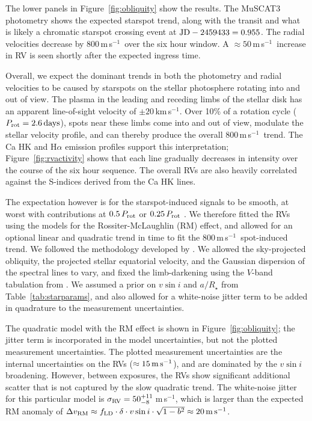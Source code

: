\documentclass[12pt,modern,twocolumn,tighten]{aastex63}
\newcommand{\kms}{\,km\,s$^{-1}$}
\newcommand{\ms}{\,m\,s$^{-1}$}
\begin{document}
The lower panels in Figure~\ref{fig:obliquity} show the results.  The
MuSCAT3 photometry shows the expected starspot trend, along with the
transit and what is likely a chromatic starspot crossing event at
${\rm JD} - 2459433 = 0.955$.  The radial velocities decrease by
800\ms\ over the six hour window.  A $\approx50$\ms\  increase in RV
is seen shortly after the expected ingress time. 

Overall, we expect the dominant trends in both the photometry and
radial velocities to be caused by starspots on the stellar photosphere
rotating into and out of view.  The plasma in the leading and receding
limbs of the stellar disk has an apparent line-of-sight velocity of
$\pm 20$\kms.  Over 10\% of a rotation cycle ($P_{\rm
rot}=2.6\,{\rm days}$), spots near these limbs come into and out of
view, modulate the stellar velocity profile, and can thereby produce
the overall 800\ms\ trend.  The Ca HK and H$\alpha$ emission
profiles support this interpretation;
Figure~\ref{fig:rvactivity} shows that each line gradually decreases in
intensity over the course of the six hour sequence.
The overall RVs are also heavily correlated against the S-indices
derived from the Ca HK lines.

The expectation however is for the starspot-induced signals to be smooth,
at worst with contributions at $0.5\,P_{\rm rot}$ or $0.25\,P_{\rm
rot}$ \citep{klein_simulated_2020}.  We therefore fitted the RVs using
the \citet{hirano_analytic_2010,hirano_2011} models for the
Rossiter-McLaughlin (RM) effect, and allowed for an optional linear
and quadratic trend in time to fit the 800\ms\ spot-induced trend.  We
followed the methodology developed by \citet{stefansson_2020}.  We
allowed the sky-projected obliquity, the projected stellar equatorial
velocity, and the Gaussian dispersion of the spectral lines to vary,
and fixed the limb-darkening using the $V$-band tabulation from
\citet{claret_gravity_2011}.  We assumed a prior on $v\sin i$ and
$a/R_\star$ from Table~\ref{tab:starparams}, and also allowed for a
white-noise jitter term to be added in quadrature to the measurement
uncertainties.

The quadratic model with the RM effect is shown in
Figure~\ref{fig:obliquity}; the jitter term is incorporated in the
model uncertainties, but not the plotted measurement uncertainties.
The plotted measurement uncertainties are the internal uncertainties
on the RVs ($\approx 15\,{\rm m\,s}^{-1}$), and are dominated by the
$v\sin i$ broadening.  However, between exposures, the RVs show
significant additional scatter that is not captured by the slow quadratic
trend.  The white-noise jitter for this
particular model is $\sigma_{\rm RV} = 50^{+11}_{-8}$\ms, which is
larger than the expected RM anomaly of $\Delta v_{\rm RM}
\approx f_{\rm LD} \cdot \delta \cdot v\sin i \cdot \sqrt{1-b^2}
\approx 20\,{\rm m\,s}^{-1}$.
\end{document}
